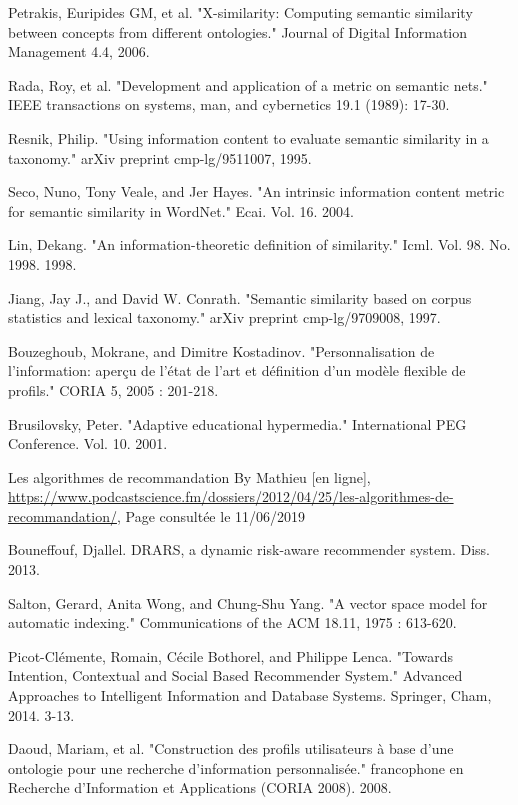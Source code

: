 \begin{thebibliography}{100}
 Petrakis, Euripides GM, et al. "X-similarity: Computing semantic similarity between concepts from different ontologies." Journal of Digital Information Management 4.4, 2006.

  Rada, Roy, et al. "Development and application of a metric on semantic nets." IEEE transactions on systems, man, and cybernetics 19.1 (1989): 17-30. 

 Resnik, Philip. "Using information content to evaluate semantic similarity in a taxonomy." arXiv preprint cmp-lg/9511007, 1995.

 Seco, Nuno, Tony Veale, and Jer Hayes. "An intrinsic information content metric for semantic similarity in WordNet." Ecai. Vol. 16. 2004.

Lin, Dekang. "An information-theoretic definition of similarity." Icml. Vol. 98. No. 1998. 1998.

 Jiang, Jay J., and David W. Conrath. "Semantic similarity based on corpus statistics and lexical taxonomy." arXiv preprint cmp-lg/9709008, 1997.

 Bouzeghoub, Mokrane, and Dimitre Kostadinov. "Personnalisation de l'information: aperçu de l'état de l'art et définition d'un modèle flexible de profils." CORIA 5, 2005 : 201-218.


 Brusilovsky, Peter. "Adaptive educational hypermedia." International PEG Conference. Vol. 10. 2001.

Les algorithmes de recommandation
By Mathieu [en ligne], \url{https://www.podcastscience.fm/dossiers/2012/04/25/les-algorithmes-de-recommandation/}, Page consultée le 11/06/2019


 Bouneffouf, Djallel. DRARS, a dynamic risk-aware recommender system. Diss. 2013.


 Salton, Gerard, Anita Wong, and Chung-Shu Yang. "A vector space model for automatic indexing." Communications of the ACM 18.11, 1975 : 613-620.


 Picot-Clémente, Romain, Cécile Bothorel, and Philippe Lenca. "Towards Intention, Contextual and Social Based Recommender System." Advanced Approaches to Intelligent Information and Database Systems. Springer, Cham, 2014. 3-13.

 Daoud, Mariam, et al. "Construction des profils utilisateurs à base d'une ontologie pour une recherche d'information personnalisée." francophone en Recherche d'Information et Applications (CORIA 2008). 2008.



\end{thebibliography}
